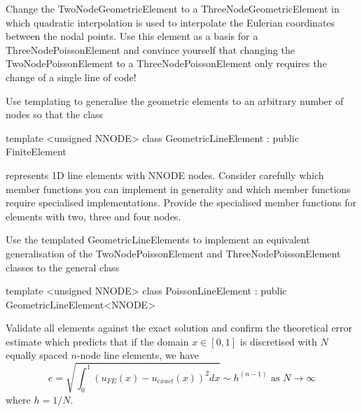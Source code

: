 \begin{DoxyItemize}
\item Change the {\ttfamily Two\+Node\+Geometric\+Element} to a {\ttfamily Three\+Node\+Geometric\+Element} in which quadratic interpolation is used to interpolate the Eulerian coordinates between the nodal points. Use this element as a basis for a {\ttfamily Three\+Node\+Poisson\+Element} and convince yourself that changing the {\ttfamily Two\+Node\+Poisson\+Element} to a {\ttfamily Three\+Node\+Poisson\+Element} only requires the change of a single line of code!
\item Use templating to generalise the geometric elements to an arbitrary number of nodes so that the class 
\begin{DoxyCode}
\textcolor{keyword}{template} <\textcolor{keywordtype}{unsigned} NNODE>
\textcolor{keyword}{class }GeometricLineElement : \textcolor{keyword}{public} FiniteElement
\end{DoxyCode}
 represents 1D line elements with {\ttfamily N\+N\+O\+DE} nodes. Consider carefully which member functions you can implement in generality and which member functions require specialised implementations. Provide the specialised member functions for elements with two, three and four nodes.
\item Use the templated {\ttfamily Geometric\+Line\+Elements} to implement an equivalent generalisation of the {\ttfamily Two\+Node\+Poisson\+Element} and {\ttfamily Three\+Node\+Poisson\+Element} classes to the general class 
\begin{DoxyCode}
\textcolor{keyword}{template} <\textcolor{keywordtype}{unsigned} NNODE>
\textcolor{keyword}{class }PoissonLineElement : \textcolor{keyword}{public} GeometricLineElement<NNODE>
\end{DoxyCode}

\item Validate all elements against the exact solution and confirm the theoretical error estimate which predicts that if the domain $ x \in [0,1]$ is discretised with $ N $ equally spaced $n$-\/node line elements, we have \[ e = \sqrt{ \int_0^1 \left( u_{FE}(x) - u_{exact}(x) \right) ^2 dx } \sim h^{(n-1)} \mbox{ \ \ \ \ as $N \to \infty$} \] where $ h = 1/N $.
\end{DoxyItemize}

 

